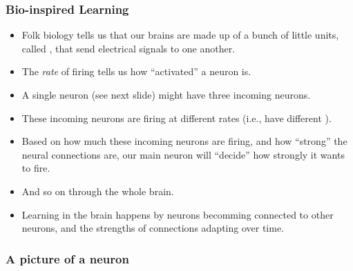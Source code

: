 \documentclass[trans]{beamer}
\begin{document}
\begin{frame}
  \frametitle{Bio-inspired Learning}
\begin{itemize}
\item Folk biology tells us that our brains are made up of a bunch of little
units, called , that send electrical signals to one
another.  
\item The \emph{rate} of firing tells us how ``activated'' a
neuron is. 
\item  A single neuron (see next slide) might have three incoming neurons. 
\item These
incoming neurons are firing at different rates (i.e., have different
). 
\item Based on how much these incoming neurons are
firing, and how ``strong'' the neural connections are, our main neuron
will ``decide'' how strongly it wants to fire.
\item   And so on through the
whole brain. 
\item Learning in the brain happens by neurons becomming
connected to other neurons, and the strengths of connections adapting
over time.
\end{itemize}
\end{frame}

\begin{frame}
\frametitle{A picture of a neuron}
\end{frame}
\end{document}
